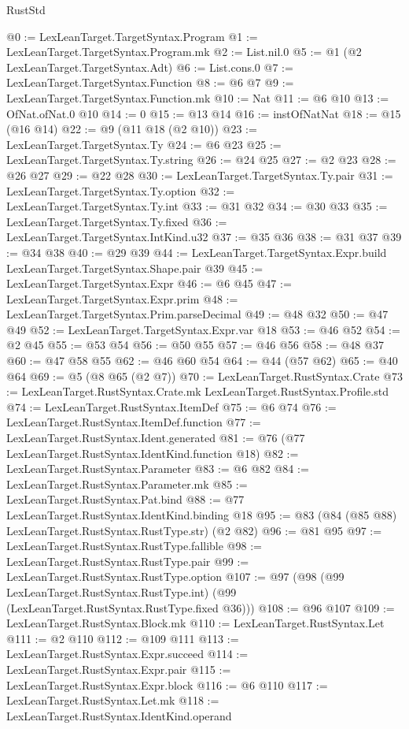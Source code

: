 \begin{lexlean}{RustStd}
\begin{coremodule}
@0 := LexLeanTarget.TargetSyntax.Program
@1 := LexLeanTarget.TargetSyntax.Program.mk
@2 := List.nil.{0}
@5 := @1 (@2 LexLeanTarget.TargetSyntax.Adt)
@6 := List.cons.{0}
@7 := LexLeanTarget.TargetSyntax.Function
@8 := @6 @7
@9 := LexLeanTarget.TargetSyntax.Function.mk
@10 := Nat
@11 := @6 @10
@13 := OfNat.ofNat.{0} @10
@14 := 0
@15 := @13 @14
@16 := instOfNatNat
@18 := @15 (@16 @14)
@22 := @9 (@11 @18 (@2 @10))
@23 := LexLeanTarget.TargetSyntax.Ty
@24 := @6 @23
@25 := LexLeanTarget.TargetSyntax.Ty.string
@26 := @24 @25
@27 := @2 @23
@28 := @26 @27
@29 := @22 @28
@30 := LexLeanTarget.TargetSyntax.Ty.pair
@31 := LexLeanTarget.TargetSyntax.Ty.option
@32 := LexLeanTarget.TargetSyntax.Ty.int
@33 := @31 @32
@34 := @30 @33
@35 := LexLeanTarget.TargetSyntax.Ty.fixed
@36 := LexLeanTarget.TargetSyntax.IntKind.u32
@37 := @35 @36
@38 := @31 @37
@39 := @34 @38
@40 := @29 @39
@44 := LexLeanTarget.TargetSyntax.Expr.build LexLeanTarget.TargetSyntax.Shape.pair @39
@45 := LexLeanTarget.TargetSyntax.Expr
@46 := @6 @45
@47 := LexLeanTarget.TargetSyntax.Expr.prim
@48 := LexLeanTarget.TargetSyntax.Prim.parseDecimal
@49 := @48 @32
@50 := @47 @49
@52 := LexLeanTarget.TargetSyntax.Expr.var @18
@53 := @46 @52
@54 := @2 @45
@55 := @53 @54
@56 := @50 @55
@57 := @46 @56
@58 := @48 @37
@60 := @47 @58 @55
@62 := @46 @60 @54
@64 := @44 (@57 @62)
@65 := @40 @64
@69 := @5 (@8 @65 (@2 @7))
@70 := LexLeanTarget.RustSyntax.Crate
@73 := LexLeanTarget.RustSyntax.Crate.mk LexLeanTarget.RustSyntax.Profile.std
@74 := LexLeanTarget.RustSyntax.ItemDef
@75 := @6 @74
@76 := LexLeanTarget.RustSyntax.ItemDef.function
@77 := LexLeanTarget.RustSyntax.Ident.generated
@81 := @76 (@77 LexLeanTarget.RustSyntax.IdentKind.function @18)
@82 := LexLeanTarget.RustSyntax.Parameter
@83 := @6 @82
@84 := LexLeanTarget.RustSyntax.Parameter.mk
@85 := LexLeanTarget.RustSyntax.Pat.bind
@88 := @77 LexLeanTarget.RustSyntax.IdentKind.binding @18
@95 := @83 (@84 (@85 @88) LexLeanTarget.RustSyntax.RustType.str) (@2 @82)
@96 := @81 @95
@97 := LexLeanTarget.RustSyntax.RustType.fallible
@98 := LexLeanTarget.RustSyntax.RustType.pair
@99 := LexLeanTarget.RustSyntax.RustType.option
@107 := @97
    (@98
      (@99 LexLeanTarget.RustSyntax.RustType.int)
      (@99 (LexLeanTarget.RustSyntax.RustType.fixed @36)))
@108 := @96 @107
@109 := LexLeanTarget.RustSyntax.Block.mk
@110 := LexLeanTarget.RustSyntax.Let
@111 := @2 @110
@112 := @109 @111
@113 := LexLeanTarget.RustSyntax.Expr.succeed
@114 := LexLeanTarget.RustSyntax.Expr.pair
@115 := LexLeanTarget.RustSyntax.Expr.block
@116 := @6 @110
@117 := LexLeanTarget.RustSyntax.Let.mk
@118 := LexLeanTarget.RustSyntax.IdentKind.operand

\end{coremodule}
\end{lexlean}
